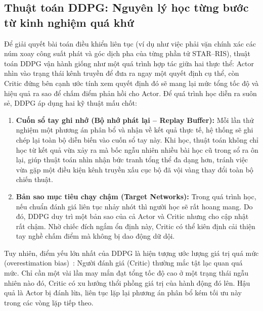 \subsection{Thuật toán DDPG: Nguyên lý học từng bước từ kinh nghiệm quá khứ}
\label{ssec:ddpg-ly-thuyet}


Để giải quyết bài toán điều khiển liên tục (ví dụ như việc phải vặn chính xác các núm xoay công suất phát
và góc dịch pha của từng phần tử STAR--RIS), thuật toán DDPG vận hành giống như một quá trình hợp tác giữa
hai thực thể: Actor nhìn vào trạng thái kênh truyền để đưa ra ngay một quyết định cụ thể, còn Critic đứng
bên cạnh ước tính xem quyết định đó sẽ mang lại mức tổng tốc độ và hiệu quả ra sao để chấm điểm phản hồi
cho Actor. Để quá trình học diễn ra suôn sẻ, DDPG áp dụng hai kỹ thuật mấu chốt:
\begin{enumerate}
\item \textbf{Cuốn sổ tay ghi nhớ (Bộ nhớ phát lại -- Replay Buffer):} Mỗi lần thử nghiệm một phương án
  phân bổ và nhận về kết quả thực tế, hệ thống sẽ ghi chép lại toàn bộ diễn biến vào cuốn sổ tay này. Khi
  học, thuật toán không chỉ học từ kết quả vừa xảy ra mà bốc ngẫu nhiên nhiều bài học cũ trong sổ ra ôn
  lại, giúp thuật toán nhìn nhận bức tranh tổng thể đa dạng hơn, tránh việc vừa gặp một điều kiện kênh
  truyền xấu cục bộ đã vội vàng thay đổi toàn bộ chiến thuật.
\item \textbf{Bản sao mục tiêu chạy chậm (Target Networks):} Trong quá trình học, nếu chuẩn đánh giá liên
  tục nhảy nhót thì người học sẽ rất hoang mang. Do đó, DDPG duy trì một bản sao của cả Actor và Critic
  nhưng cho cập nhật rất chậm. Nhờ chiếc đích ngắm ổn định này, Critic có thể kiên định cải thiện tay nghề
  chấm điểm mà không bị dao động dữ dội.
\end{enumerate}

Tuy nhiên, điểm yếu lớn nhất của DDPG là hiện tượng ước lượng giá trị quá mức (overestimation
bias)~\cite{Fujimoto2018TD3}: Người đánh giá (Critic) thường mắc tật lạc quan quá mức. Chỉ cần một vài lần
may mắn đạt tổng tốc độ cao ở một trạng thái ngẫu nhiên nào đó, Critic có xu hướng thổi phồng giá trị của
hành động đó lên. Hậu quả là Actor bị đánh lừa, liên tục lặp lại phương án phân bổ kém tối ưu này trong
các vòng lặp tiếp theo.

